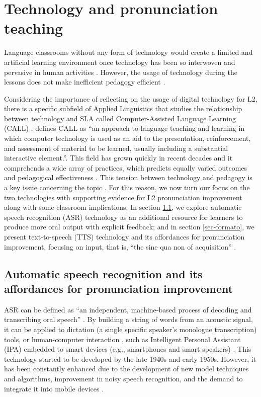 \documentclass[english]{textolivre}
\begin{document}
\section{Technology and pronunciation teaching}\label{sec-conduta}
Language classrooms without any form of technology would create a limited and artificial learning environment once technology has been so interwoven and pervasive in human activities \cite{chun_technology_2016}. However, the usage of technology during the lessons does not make inefficient pedagogy efficient \cite{golonka_technologies_2014}.

Considering the importance of reflecting on the usage of digital technology for L2, there is a specific subfield of Applied Linguistics that studies the relationship between technology and SLA called Computer-Assisted Language Learning (CALL) \cite{martins_o_2012}. \textcite[p. 261]{davies_computer-assisted_2006} defines CALL as “an approach to language teaching and learning in which computer technology is used as an aid to the presentation, reinforcement, and assessment of material to be learned, usually including a substantial interactive element.”. This field has grown quickly in recent decades \cite{pennington_english_2019} and it comprehends a wide array of practices, which predicts equally varied outcomes and pedagogical effectiveness \cite{chapelle_automatic_2013}. This tension between technology and pedagogy is a key issue concerning the topic \cite{rogerson-revell_computer-assisted_2021}. For this reason, we now turn our focus on the two technologies with supporting evidence for L2 pronunciation improvement along with some classroom implications. In section \ref{sec-fmt-manuscrito}, we explore automatic speech recognition (ASR) technology as an additional resource for learners to produce more oral output with explicit feedback; and in section \ref{sec-formato}, we present text-to-speech (TTS) technology and its affordances for pronunciation improvement, focusing on input, that is, “the sine qua non of acquisition” \cite[p. 177]{grass_2015}.


\subsection{Automatic speech recognition and its affordances for pronunciation improvement}\label{sec-fmt-manuscrito}
ASR can be defined as “an independent, machine-based process of decoding and transcribing oral speech” \cite[p. 316]{levis_2013}. By building a string of words from an acoustic signal, it can be applied to dictation (a single specific speaker’s monologue transcription) tools, or human-computer interaction \cite{jurafsky_speech_2000}, such as Intelligent Personal Assistant (IPA) embedded to smart devices (e.g., smartphones and smart speakers) \cite{inceoglu_asr_2020, moussalli_intelligent_2020}. This technology started to be developed by the late 1940s and early 1950s. However, it has been constantly enhanced due to the development of new model techniques and algorithms, improvement in noisy speech recognition, and the demand to integrate it into mobile devices \cite{jurafsky_speech_2000, levis_2013}.
\end{document}
